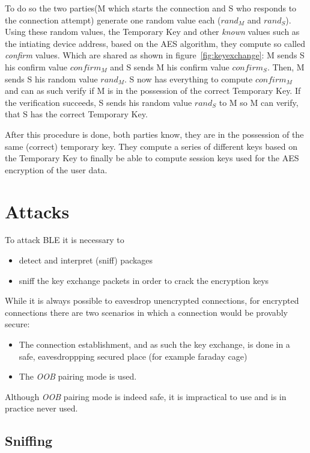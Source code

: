 \documentclass[conference]{IEEEtran}
\begin{document}
To do so the two parties(M which starts the connection and S who responds to the connection attempt) generate one random value each ($rand_M$ and $rand_S$). Using these random values, the Temporary Key and other \emph{known} values such as the intiating device address, based on the AES algorithm, they compute so called \emph{confirm} values. Which are shared as shown in figure~\ref{fig:keyexchange}: M sends S his confirm value $confirm_M$ and S sends M his confirm value $confirm_S$. Then, M sends S his random value $rand_M$. S now has everything to compute $confirm_M$ and can as such verify if M is in the possession of the correct Temporary Key. If the verification succeeds, S sends his random value $rand_S$ to M so M can verify, that S has the correct Temporary Key.

After this procedure is done, both parties know, they are in the possession of the same (correct) temporary key. They compute a series of different keys based on the Temporary Key to finally be able to compute session keys used for the AES encryption of the user data.

\section{Attacks}
\label{attacks}

To attack BLE it is necessary to
\begin{itemize}
  \item detect and interpret (sniff) packages
  \item sniff the key exchange packets in order to crack the encryption keys
\end{itemize}

While it is always possible to eavesdrop unencrypted connections, for encrypted connections there are two scenarios in which a connection would be provably secure:
\begin{itemize}
  \item The connection establishment, and as such the key exchange, is done in a safe, eavesdroppping secured place (for example faraday cage)
  \item The \emph{OOB} pairing mode is used.
\end{itemize}

Although \emph{OOB} pairing mode is indeed safe, it is impractical to use and is in practice never used.

\subsection{Sniffing}
\end{document}
